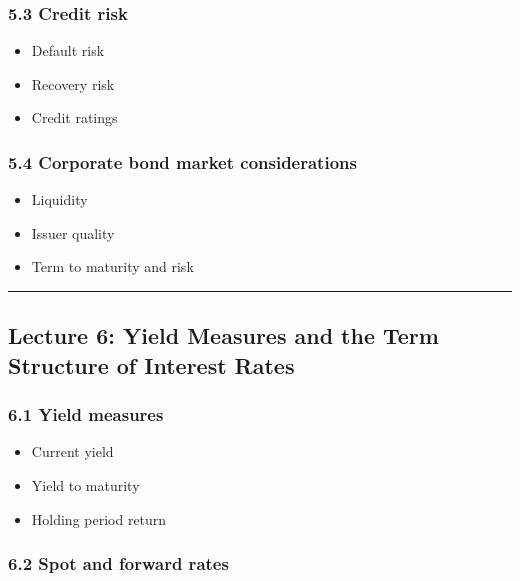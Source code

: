 \documentclass[
  letterpaper,
  DIV=11,
  numbers=noendperiod]{scrartcl}
\providecommand{\tightlist}{%
  \setlength{\itemsep}{0pt}\setlength{\parskip}{0pt}}
\begin{document}
\subsubsection{5.3 Credit risk}\label{credit-risk}

\begin{itemize}
\tightlist
\item
  Default risk
\item
  Recovery risk
\item
  Credit ratings
\end{itemize}

\subsubsection{5.4 Corporate bond market
considerations}\label{corporate-bond-market-considerations}

\begin{itemize}
\tightlist
\item
  Liquidity
\item
  Issuer quality
\item
  Term to maturity and risk
\end{itemize}

\begin{center}\rule{0.5\linewidth}{0.5pt}\end{center}

\subsection{Lecture 6: Yield Measures and the Term Structure of Interest
Rates}\label{lecture-6-yield-measures-and-the-term-structure-of-interest-rates}

\subsubsection{6.1 Yield measures}\label{yield-measures}

\begin{itemize}
\tightlist
\item
  Current yield
\item
  Yield to maturity
\item
  Holding period return
\end{itemize}

\subsubsection{6.2 Spot and forward rates}\label{spot-and-forward-rates}
\end{document}
